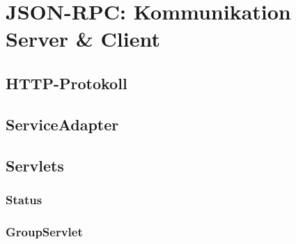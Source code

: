 
\section{JSON-RPC: Kommunikation Server \& Client}
	\subsection{HTTP-Protokoll}
	\subsection{ServiceAdapter}
	\subsection{Servlets}
	\subsubsection{Status}
	\subsubsection{GroupServlet}
	\newpage